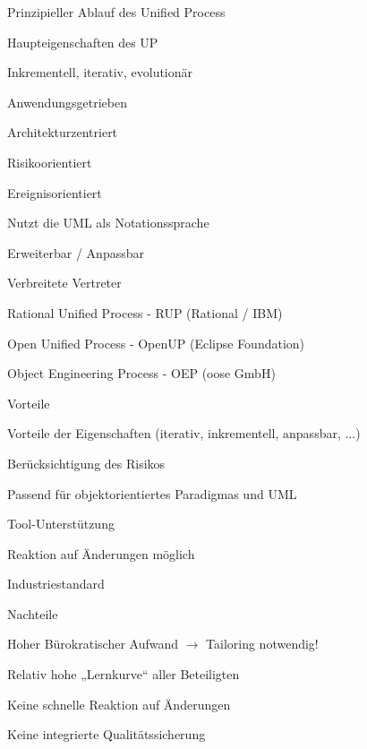 \documentclass[a4paper]{article}
\begin{document}
\begin{multicols}{3}
  Prinzipieller Ablauf des Unified Process
  \begin{itemize*}
    \item Haupteigenschaften des UP
    \begin{itemize*}
      \item Inkrementell, iterativ, evolutionär
      \item Anwendungsgetrieben
      \item Architekturzentriert
      \item Risikoorientiert
      \item Ereignisorientiert
      \item Nutzt die UML als Notationssprache
      \item Erweiterbar / Anpassbar
    \end{itemize*}
    \item Verbreitete Vertreter
    \begin{itemize*}
      \item Rational Unified Process - RUP (Rational / IBM)
      \item Open Unified Process - OpenUP (Eclipse Foundation)
      \item Object Engineering Process - OEP (oose GmbH)
    \end{itemize*}
    \item Vorteile
    \begin{itemize*}
      \item Vorteile der Eigenschaften (iterativ, inkrementell, anpassbar, ...)
      \item Berücksichtigung des Risikos
      \item Passend für objektorientiertes Paradigmas und UML
      \item Tool-Unterstützung
      \item Reaktion auf Änderungen möglich
      \item Industriestandard
    \end{itemize*}
    \item Nachteile
    \begin{itemize*}
      \item Hoher Bürokratischer Aufwand $\rightarrow$ Tailoring notwendig!
      \item Relativ hohe „Lernkurve“ aller Beteiligten
      \item Keine schnelle Reaktion auf Änderungen
      \item Keine integrierte Qualitätssicherung
    \end{itemize*}
  \end{itemize*}


\end{multicols}
\end{document}
